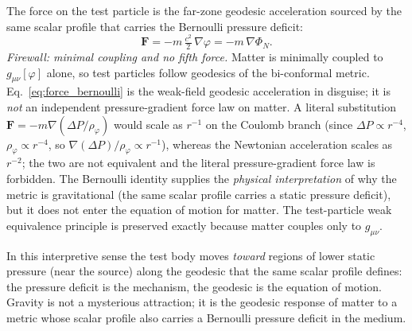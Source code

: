 \documentclass[aps,prd,onecolumn,superscriptaddress,nofootinbib,showpacs,12pt,notitlepage]{revtex4-2}
\begin{document}
The force on the test particle is the far-zone geodesic
acceleration sourced by the same scalar profile that carries
the Bernoulli pressure deficit:
\begin{equation}\label{eq:force_bernoulli}
  \mathbf{F} = -m\,\tfrac{c^{2}}{2}\,\nabla\varphi
  = -m\,\nabla\Phi_{N}.
\end{equation}
\textit{Firewall: minimal coupling and no fifth force.}
Matter is minimally coupled to $g_{\mu\nu}[\varphi]$ alone,
so test particles follow geodesics of the bi-conformal
metric.  Eq.~\eqref{eq:force_bernoulli} is the weak-field
geodesic acceleration in disguise; it is \emph{not} an
independent pressure-gradient force law on matter.  A
literal substitution $\mathbf{F}=-m\nabla(\Delta P/\rho_{\varphi})$
would scale as $r^{-1}$ on the Coulomb branch (since
$\Delta P\propto r^{-4}$, $\rho_{\varphi}\propto r^{-4}$,
so $\nabla(\Delta P)/\rho_{\varphi}\propto r^{-1}$), whereas
the Newtonian acceleration scales as $r^{-2}$; the two are
not equivalent and the literal pressure-gradient force law
is forbidden.  The Bernoulli identity supplies the
\emph{physical interpretation} of why the metric is
gravitational (the same scalar profile carries a static
pressure deficit), but it does not enter the equation of
motion for matter.  The test-particle weak equivalence
principle is preserved exactly because matter couples only
to $g_{\mu\nu}$.

In this interpretive sense the test body moves \emph{toward}
regions of lower static pressure (near the source) along the
geodesic that the same scalar profile defines: the pressure
deficit is the mechanism, the geodesic is the equation of
motion.  Gravity is not a mysterious attraction; it is the
geodesic response of matter to a metric whose scalar profile
also carries a Bernoulli pressure deficit in the medium.
\end{document}
